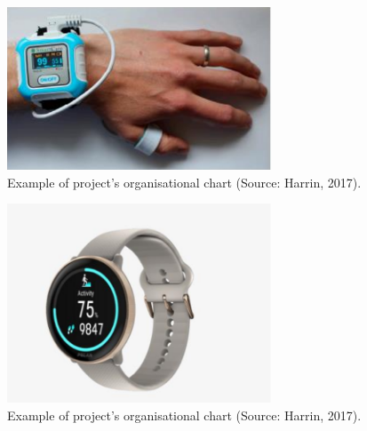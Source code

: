 \documentclass{article}
\begin{document}
\begin{figure}[h]
  \centering
  \includegraphics[width=0.7\textwidth]{hand.png}
  \caption{ Example of project's organisational chart (Source: Harrin, 2017).}
  \label{harrin}
\end{figure}


\begin{figure}[h]
  \centering
  \includegraphics[width=0.7\textwidth]{watch1.png}
  \caption{ Example of project's organisational chart (Source: Harrin, 2017).}
  \label{harrin}
\end{figure}
\end{document}
